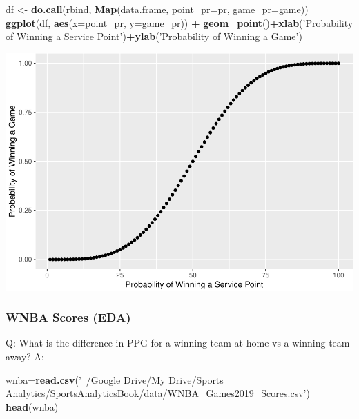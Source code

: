 \documentclass[]{article}
\newenvironment{Shaded}{\begin{snugshade}}{\end{snugshade}}
\newcommand{\DataTypeTok}[1]{\textcolor[rgb]{0.13,0.29,0.53}{#1}}
\newcommand{\KeywordTok}[1]{\textcolor[rgb]{0.13,0.29,0.53}{\textbf{#1}}}
\newcommand{\NormalTok}[1]{#1}
\newcommand{\OperatorTok}[1]{\textcolor[rgb]{0.81,0.36,0.00}{\textbf{#1}}}
\newcommand{\StringTok}[1]{\textcolor[rgb]{0.31,0.60,0.02}{#1}}
\begin{document}
\begin{Shaded}
\begin{Highlighting}[]
\NormalTok{df <-}\StringTok{ }\KeywordTok{do.call}\NormalTok{(rbind, }\KeywordTok{Map}\NormalTok{(data.frame, }\DataTypeTok{point_pr=}\NormalTok{pr, }\DataTypeTok{game_pr=}\NormalTok{game))}
\KeywordTok{ggplot}\NormalTok{(df, }\KeywordTok{aes}\NormalTok{(}\DataTypeTok{x=}\NormalTok{point_pr, }\DataTypeTok{y=}\NormalTok{game_pr)) }\OperatorTok{+}
\StringTok{  }\KeywordTok{geom_point}\NormalTok{()}\OperatorTok{+}\KeywordTok{xlab}\NormalTok{(}\StringTok{'Probability of Winning a Service Point'}\NormalTok{)}\OperatorTok{+}\KeywordTok{ylab}\NormalTok{(}\StringTok{'Probability of Winning a Game'}\NormalTok{)}
\end{Highlighting}
\end{Shaded}

\includegraphics{22-isaac_files/figure-latex/unnamed-chunk-7-1.pdf}

\hypertarget{wnba-scores-eda}{%
\subsubsection{WNBA Scores (EDA)}\label{wnba-scores-eda}}

Q: What is the difference in PPG for a winning team at home vs a winning
team away? A:

\begin{Shaded}
\begin{Highlighting}[]
\NormalTok{wnba=}\KeywordTok{read.csv}\NormalTok{(}\StringTok{'~/Google Drive/My Drive/Sports Analytics/SportsAnalyticsBook/data/WNBA_Games2019_Scores.csv'}\NormalTok{)}
\KeywordTok{head}\NormalTok{(wnba)}
\end{Highlighting}
\end{Shaded}
\end{document}
